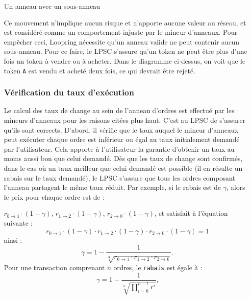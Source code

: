 \documentclass[UTF8,nofonts]{article}
\makeatletter
\newenvironment{figurehere}
 {\def\@captype{figure}}
 {}
\makeatother
\begin{document}
\begin{multicols}{2}
\begin{center}
\begin{figurehere}
\begin{tikzpicture}
\end{tikzpicture}

\caption{Un anneau avec un sous-anneau}
\label{fig:subring}
\end{figurehere}
\end{center}

Ce mouvement n'implique aucun risque et n'apporte aucune valeur au réseau, et est considéré comme un comportement injuste par le mineur d'anneaux. Pour empêcher ceci, Loopring nécessite qu'un anneau valide ne peut contenir aucun sous-anneau. Pour ce faire, le LPSC s'assure qu'un token ne peut être plus d'une fois un token à vendre ou à acheter. Dans le diagramme ci-dessus, on voit que le token \verb|A| est vendu et acheté deux fois, ce qui devrait être rejeté.


\subsubsection{Vérification du taux d'exécution\label{sec:fill_rate_check}}

Le calcul des taux de change au sein de l'anneau d'ordres est effectué par les mineurs d'anneaux pour les raisons citées plus haut. C'est au LPSC de s'assurer qu'ils sont corrects. D'abord, il vérifie que le taux auquel le mineur d'anneaux peut exécuter chaque ordre est inférieur ou égal au taux initialement demandé par l'utilisateur. Cela apporte à l'utilisateur la garantie d'obtenir un taux au moins aussi bon que celui demandé. Dès que les taux de change sont confirmés, dans le cas où un taux meilleur que celui demandé est possible (il en résulte un rabais sur le taux demandé), le LPSC s'assure que tous les ordres composant l'anneau partagent le même taux réduit. Par exemple, si le rabais est de $\gamma$, alors le prix pour chaque ordre est de :

$r_{0\rightarrow 1} \cdot (1-\gamma)$, $r_{1\rightarrow 2} \cdot (1-\gamma)$, $r_{2 \rightarrow 0} \cdot (1-\gamma)$, et satisfait à l'équation suivante : 
\begin{equation}
r_{0\rightarrow 1} \cdot (1-\gamma)\cdot r_{1\rightarrow 2} \cdot (1-\gamma) \cdot r_{2 \rightarrow 0} \cdot (1-\gamma) = 1
\end{equation}
ainsi : 
\begin{equation}
\gamma = 1- \frac{1}{\sqrt[3]{r_{0\rightarrow 1} \cdot r_{1\rightarrow 2} \cdot r_{2\rightarrow 0}}}\text{.}
\end{equation}
Pour une transaction comprenant $n$ ordres, le \texttt{rabais} est égale à : 
\begin{equation}
\gamma = 1- \frac{1}{\sqrt[n]{\prod_{i=0}^{n-1} r^i}} \text{,}
\end{equation}


\end{multicols}
\end{document}
